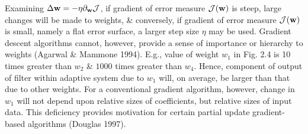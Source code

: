 \documentclass{article}
\begin{document}
\begin{enumerate}
\begin{itemize}
\begin{itemize}
			Examining $\Delta{\bf w} = -\eta\partial_{\bf w}{\cal J}$, if gradient of error measure ${\cal J}({\bf w})$ is steep, large changes will be made to weights, \& conversely, if gradient of error measure ${\cal J}({\bf w})$ is small, namely a flat error surface, a larger step size $\eta$ may be used. Gradient descent algorithms cannot, however, provide a sense of importance or hierarchy to weights (Agarwal \& Mammone 1994). E.g., value of weight $w_1$ in Fig. 2.4 is 10 times greater than $w_2$ \& $1000$ times greater than $w_4$. Hence, component of output of filter within adaptive system due to $w_1$ will, on average, be larger than that due to other weights. For a conventional gradient algorithm, however, change in $w_1$ will not depend upon relative sizes of coefficients, but relative sizes of input data. This deficiency provides motivation for certain partial update gradient-based algorithms (Douglas 1997).
			

\end{itemize}
\end{itemize}
\end{enumerate}
\end{document}
